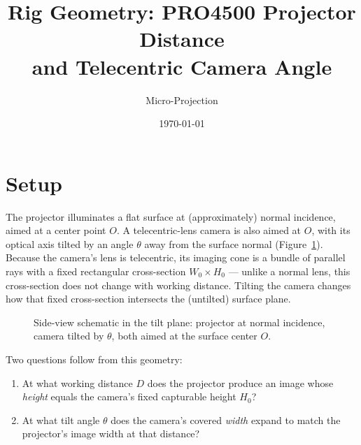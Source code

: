 \documentclass[11pt]{article}
\title{Rig Geometry: PRO4500 Projector Distance\\ and Telecentric Camera Angle}
\author{Micro-Projection}
\date{\today}
\begin{document}
\maketitle

\section{Setup}

The projector illuminates a flat surface at (approximately) normal incidence,
aimed at a center point $O$. A telecentric-lens camera is also aimed at $O$,
with its optical axis tilted by an angle $\theta$ away from the surface
normal (Figure~\ref{fig:setup}). Because the camera's lens is telecentric,
its imaging cone is a bundle of parallel rays with a fixed rectangular
cross-section $W_0 \times H_0$ --- unlike a normal lens, this cross-section
does not change with working distance. Tilting the camera changes how that
fixed cross-section intersects the (untilted) surface plane.

\begin{figure}[h]
\centering
{}
\caption{Side-view schematic in the tilt plane: projector at normal
incidence, camera tilted by $\theta$, both aimed at the surface center
$O$.}
\label{fig:setup}
\end{figure}

Two questions follow from this geometry:
\begin{enumerate}
  \item At what working distance $D$ does the projector produce an image
        whose \emph{height} equals the camera's fixed capturable height
        $H_0$?
  \item At what tilt angle $\theta$ does the camera's covered
        \emph{width} expand to match the projector's image width at that
        distance?
\end{enumerate}
\end{document}

